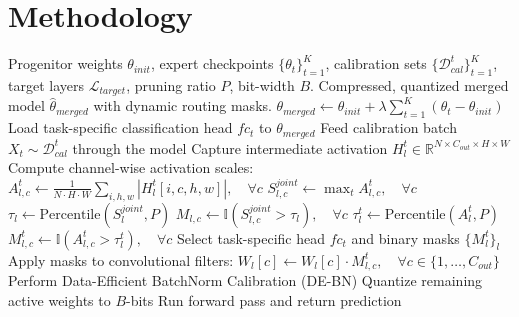 \documentclass{article}
\theoremstyle{plain}
\theoremstyle{definition}
\theoremstyle{remark}
\begin{document}
\section{Methodology}
\label{sec:method}

\begin{algorithm}[!t]
   \caption{Activation-Aware Structured Channel Pruning for Quantized Merging}
   \label{alg:acp}
   \vskip 0.1in
   \begin{small}
\begin{algorithmic}[1]
    Progenitor weights $\theta_{init}$, expert checkpoints $\{\theta_t\}_{t=1}^K$, calibration sets $\{\mathcal{D}^t_{cal}\}_{t=1}^K$, target layers $\mathcal{L}_{target}$, pruning ratio $P$, bit-width $B$.
    Compressed, quantized merged model $\hat{\theta}_{merged}$ with dynamic routing masks.
   \STATE
   \STATE {}
   \STATE $\theta_{merged} \leftarrow \theta_{init} + \lambda \sum_{t=1}^K (\theta_t - \theta_{init})$
   \STATE
   \STATE {}
       \STATE Load task-specific classification head $fc_t$ to $\theta_{merged}$
           \STATE Feed calibration batch $X_t \sim \mathcal{D}^t_{cal}$ through the model
           \STATE Capture intermediate activation $H^t_l \in \mathbb{R}^{N \times C_{out} \times H \times W}$
           \STATE Compute channel-wise activation scales:
           \STATE $A^t_{l, c} \leftarrow \frac{1}{N \cdot H \cdot W} \sum_{i,h,w} |H^t_l[i, c, h, w]|, \quad \forall c$
       \ENDFOR
   \ENDFOR
   \STATE
   \STATE {}
       \STATE {}
       \STATE $S^{joint}_{l, c} \leftarrow \max_t A^t_{l, c}, \quad \forall c$
       \STATE $\tau_l \leftarrow \text{Percentile}(S^{joint}_l, P)$
       \STATE $M_{l, c} \leftarrow \mathbb{I}(S^{joint}_{l, c} > \tau_l), \quad \forall c$
       \STATE
       \STATE {}
           \STATE $\tau^t_l \leftarrow \text{Percentile}(A^t_l, P)$
           \STATE $M^t_{l, c} \leftarrow \mathbb{I}(A^t_{l, c} > \tau^t_l), \quad \forall c$
       \ENDFOR
   \ENDFOR
   \STATE
   \STATE {}
       \STATE Select task-specific head $fc_t$ and binary masks $\{M^t_l\}_{l}$
       \STATE Apply masks to convolutional filters:
       \STATE $W_l[c] \leftarrow W_l[c] \cdot M^t_{l, c}, \quad \forall c \in \{1, \dots, C_{out}\}$
       \STATE Perform Data-Efficient BatchNorm Calibration (DE-BN)
       \STATE Quantize remaining active weights to $B$-bits
       \STATE Run forward pass and return prediction
   \ENDFOR
\end{algorithmic}
\end{small}
\end{algorithm}
\end{document}
